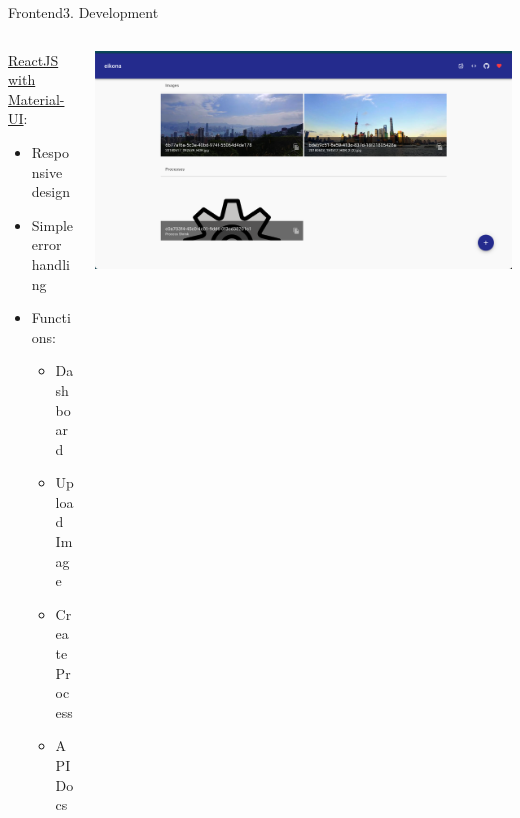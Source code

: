 \documentclass[aspectratio=169,20pt]{beamer}
\begin{document}
\begin{frame}{Frontend}{3. Development}
	\begin{columns}[onlytextwidth,T]
		\begin{column}{.40\linewidth}
			\underline{ReactJS with Material-UI}:
			\vspace{1in}
			\begin{itemize}
				\item{Responsive design}
				\item{Simple error handling}
				\item{Functions:}
				\begin{itemize}
					\item{Dashboard}
					\item{Upload Image}
					\item{Create Process}
					\item{API Docs}
				\end{itemize}
			\end{itemize}
		\end{column}	
		\begin{column}{.60\linewidth}
			\includegraphics[scale=0.35]{frontend}
		\end{column}
	\end{columns}
\end{frame}
\end{document}
